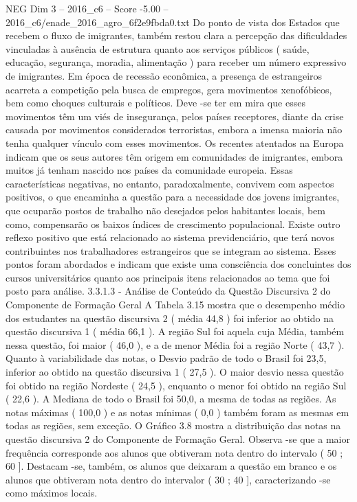 \begin{textsample}{NEG Dim 3 – 2016\_c6 – Score -5.00 – 2016\_c6/enade\_2016\_agro\_6f2e9fbda0.txt}
Do ponto de vista dos Estados que recebem o fluxo de imigrantes, também restou clara a percepção das dificuldades vinculadas à ausência de estrutura quanto aos serviços públicos ( saúde, educação, segurança, moradia, alimentação ) para receber um número expressivo de imigrantes.
Em época de recessão econômica, a presença de estrangeiros acarreta a competição pela busca de empregos, gera movimentos xenofóbicos, bem como choques culturais e políticos.
Deve -se ter em mira que esses movimentos têm um viés de insegurança, pelos países receptores, diante da crise causada por movimentos considerados terroristas, embora a imensa maioria não tenha qualquer vínculo com esses movimentos.
Os recentes atentados na Europa indicam que os seus autores têm origem em comunidades de imigrantes, embora muitos já tenham nascido nos países da comunidade europeia.
Essas características negativas, no entanto, paradoxalmente, convivem com aspectos positivos, o que encaminha a questão para a necessidade dos jovens imigrantes, que ocuparão postos de trabalho não desejados pelos habitantes locais, bem como, compensarão os baixos índices de crescimento populacional.
Existe outro reflexo positivo que está relacionado ao sistema previdenciário, que terá novos contribuintes nos trabalhadores estrangeiros que se integram ao sistema.
Esses pontos foram abordados e indicam que existe uma consciência dos concluintes dos cursos universitários quanto aos principais itens relacionados ao tema que foi posto para análise. 3.3.1.3 - Análise de Conteúdo da Questão Discursiva 2 do Componente de Formação Geral A Tabela 3.15 mostra que o desempenho médio dos estudantes na questão discursiva 2 ( média 44,8 ) foi inferior ao obtido na questão discursiva 1 ( média 66,1 ).
A região Sul foi aquela cuja Média, também nessa questão, foi maior ( 46,0 ), e a de menor Média foi a região Norte ( 43,7 ).
Quanto à variabilidade das notas, o Desvio padrão de todo o Brasil foi 23,5, inferior ao obtido na questão discursiva 1 ( 27,5 ).
O maior desvio nessa questão foi obtido na região Nordeste ( 24,5 ), enquanto o menor foi obtido na região Sul ( 22,6 ).
A Mediana de todo o Brasil foi 50,0, a mesma de todas as regiões.
As notas máximas ( 100,0 ) e as notas mínimas ( 0,0 ) também foram as mesmas em todas as regiões, sem exceção.
O Gráfico 3.8 mostra a distribuição das notas na questão discursiva 2 do Componente de Formação Geral.
Observa -se que a maior frequência corresponde aos alunos que obtiveram nota dentro do intervalo ( 50 ; 60 ].
Destacam -se, também, os alunos que deixaram a questão em branco e os alunos que obtiveram nota dentro do intervalor ( 30 ; 40 ], caracterizando -se como máximos locais.

\end{textsample}
